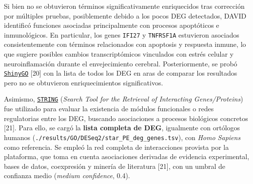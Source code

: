 \documentclass[
  12pt,
  letterpaper,
  DIV=11,
  numbers=noendperiod]{scrartcl}
\begin{document}
Si bien no se obtuvieron términos significativamente enriquecidos tras
corrección por múltiples pruebas, posiblemente debido a los pocos DEG
detectados, DAVID identificó funciones asociadas principalmente con
procesos apoptóticos e inmunológicos. En particular, los genes
\texttt{IFI27} y \texttt{TNFRSF1A} estuvieron asociados consistentemente
con términos relacionados con apoptosis y respuesta inmune, lo que
sugiere posibles cambios transcriptómicos vinculados con estrés celular
y neuroinflamación durante el envejecimiento cerebral. Posteriormente,
se probó \href{https://bioinformatics.sdstate.edu/go/}{\texttt{ShinyGO}}
{[}20{]} con la lista de todos los DEG en aras de comparar los
resultados pero no se obtuvieron enriquecimientos significativos.

\begin{table}[H]

\caption{\label{tbl-david-summarized}Tabla de términos enriquecidos en
DAVID para genes subexpresados con DESeq2 y STAR. Se incluyen las
columnas de categoría, término, p-value, Benjamini, fold enrichment y
genes asociados. Los términos se ordenan por p-value de forma
ascendente.}


\end{table}%

Asimismo, \href{https://string-db.org}{\texttt{STRING}} (\emph{Search
Tool for the Retrieval of Interacting Genes/Proteins}) fue utilizado
para evaluar la existencia de módulos funcionales o redes regulatorias
entre los DEG, buscando asociaciones a procesos biológicos concretos
{[}21{]}. Para ello, se cargó la \textbf{lista completa de DEG},
igualmente con ortólogos humanos
(\texttt{./results/GO/DESeq2/star\_PE\_deg\_genes.tsv}), con \emph{Homo
Sapiens} como referencia. Se empleó la red completa de interacciones
provista por la plataforma, que toma en cuenta asociaciones derivadas de
evidencia experimental, bases de datos, coexpresión y minería de
literatura {[}21{]}, con un umbral de confianza medio (\emph{medium
confidence}, 0.4).
\end{document}
